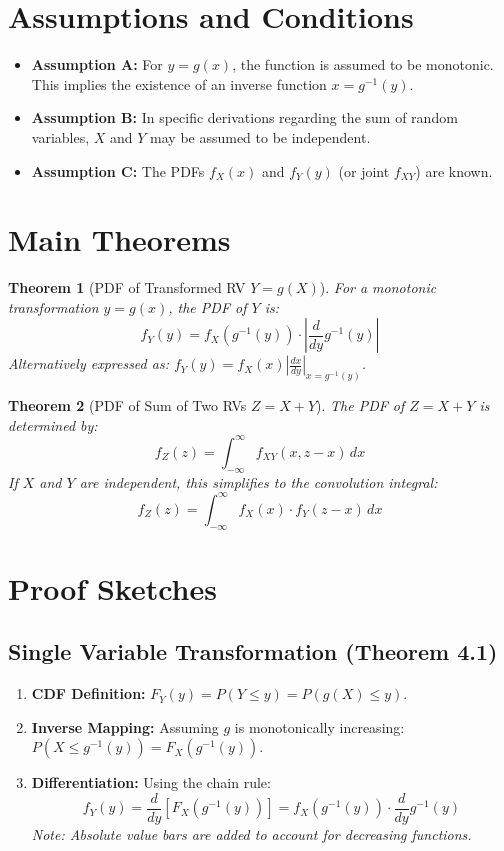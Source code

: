 \documentclass[11pt]{article}
\newtheorem{theorem}{Theorem}[section]
\begin{document}
\section{Assumptions and Conditions}
\begin{itemize}
    \item \textbf{Assumption A:} For $y = g(x)$, the function is assumed to be monotonic. This implies the existence of an inverse function $x = g^{-1}(y)$.
    \item \textbf{Assumption B:} In specific derivations regarding the sum of random variables, $X$ and $Y$ may be assumed to be independent.
    \item \textbf{Assumption C:} The PDFs $f_X(x)$ and $f_Y(y)$ (or joint $f_{XY}$) are known.
\end{itemize}

\section{Main Theorems}

\begin{theorem}[PDF of Transformed RV $Y=g(X)$]
For a monotonic transformation $y = g(x)$, the PDF of $Y$ is:
\[ f_Y(y) = f_X(g^{-1}(y)) \cdot \left| \frac{d}{dy} g^{-1}(y) \right| \]
Alternatively expressed as: $f_Y(y) = f_X(x) \left| \frac{dx}{dy} \right|_{x=g^{-1}(y)}$.
\end{theorem}

\begin{theorem}[PDF of Sum of Two RVs $Z=X+Y$]
The PDF of $Z = X + Y$ is determined by:
\[ f_Z(z) = \int_{-\infty}^{\infty} f_{XY}(x, z-x) \, dx \]
If $X$ and $Y$ are independent, this simplifies to the convolution integral:
\[ f_Z(z) = \int_{-\infty}^{\infty} f_X(x) \cdot f_Y(z-x) \, dx \]
\end{theorem}

\section{Proof Sketches}

\subsection{Single Variable Transformation (Theorem 4.1)}
\begin{enumerate}
    \item \textbf{CDF Definition:} $F_Y(y) = P(Y \le y) = P(g(X) \le y)$.
    \item \textbf{Inverse Mapping:} Assuming $g$ is monotonically increasing: $P(X \le g^{-1}(y)) = F_X(g^{-1}(y))$.
    \item \textbf{Differentiation:} Using the chain rule:
    \[ f_Y(y) = \frac{d}{dy} [F_X(g^{-1}(y))] = f_X(g^{-1}(y)) \cdot \frac{d}{dy} g^{-1}(y) \]
    \textit{Note: Absolute value bars are added to account for decreasing functions.}
\end{enumerate}
\end{document}
